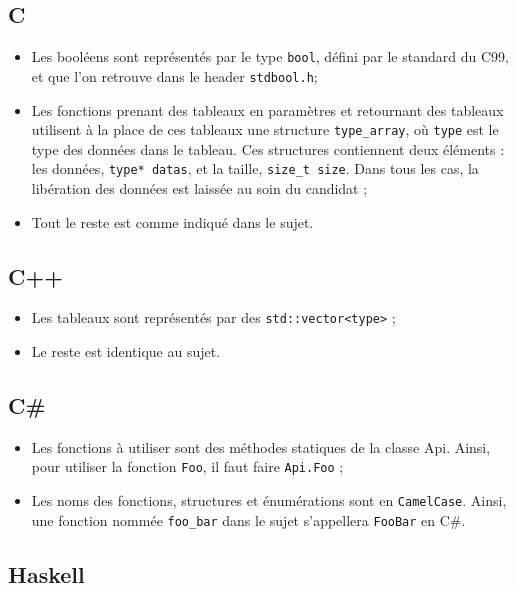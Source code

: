 \subsection{C}

\begin{itemize}
\item{Les booléens sont représentés par le type \texttt{bool}, défini par le
      standard du C99, et que l'on retrouve dans le header \texttt{stdbool.h};}
\item{Les fonctions prenant des tableaux en paramètres et retournant des
      tableaux utilisent à la place de ces tableaux une structure
      \texttt{type\_array}, où \texttt{type} est le type des données dans le
      tableau. Ces structures contiennent deux éléments : les données,
      \texttt{type* datas}, et la taille, \texttt{size\_t size}. Dans tous les
      cas, la libération des données est laissée au soin du candidat ;}
\item{Tout le reste est comme indiqué dans le sujet.}
\end{itemize}

\subsection{C++}

\begin{itemize}
\item{Les tableaux sont représentés par des \texttt{std::vector<type>} ;}
\item{Le reste est identique au sujet.}
\end{itemize}

\subsection{C\#}

\begin{itemize}
\item{Les fonctions à utiliser sont des méthodes statiques de la classe Api.
      Ainsi, pour utiliser la fonction \texttt{Foo}, il faut faire
      \texttt{Api.Foo} ;}
\item{Les noms des fonctions, structures et énumérations sont en
      \texttt{CamelCase}. Ainsi, une fonction nommée \texttt{foo\_bar} dans
      le sujet s'appellera \texttt{FooBar} en C\#.}
\end{itemize}

\subsection{Haskell}

